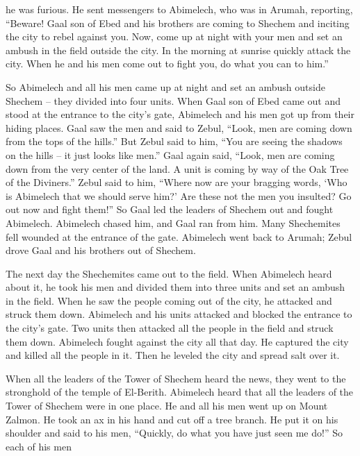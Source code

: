 {he was furious.
He sent
messengers
to
Abimelech,
who was in Arumah,
reporting,
“Beware!
 Gaal
son
of Ebed
and his brothers
are coming
to Shechem
and inciting
the city
to rebel against you.
Now,
come up
at night
with
your
men
and set an ambush
in the field outside the city.
In the morning
at sunrise
quickly
attack
the city.
When he and his men
come out
to
fight you, do
what
you can to him.”
\par }{\PP {}So Abimelech
and all
his men
came up
at night
and set an ambush
outside Shechem
– they divided into four
units.
When Gaal
son
of Ebed
came out
and stood
at the entrance
to the city’s
gate,
Abimelech
and his men
got up
from
their hiding places.
Gaal
saw
the men
and said
to
Zebul,
“Look,
men
are coming down
from the tops
of the hills.”
But Zebul
said
to
him, “You
are seeing
the shadows
on the hills
– it just looks like men.”
Gaal
again
said,
“Look,
men
are coming down
from the very center
of the land.
A unit
is coming
by way
of the Oak
Tree of the Diviners.”
Zebul
said
to him,
“Where
now
are your bragging words, ‘Who
is Abimelech
that
we should serve
him?’ Are these
not
the men
you insulted? Go out
now
and fight them!”
So Gaal
led
the leaders
of
Shechem
out
and fought
Abimelech.
Abimelech
chased
him, and Gaal ran
from
him. Many
Shechemites fell
wounded
at the entrance
of the gate.
Abimelech
went back
to Arumah;
Zebul
drove
Gaal
and his brothers
out
of Shechem.
\par }{\PP {}The next day
the Shechemites
came
out
to the field.
When Abimelech
heard about it,
he took
his men
and divided
them into three
units
and set an ambush
in the field.
When he saw
the people
coming
out
of the city,
he attacked
and struck them down.
Abimelech
and his units
attacked and blocked
the entrance
to the city’s
gate.
Two
units
then attacked
all
the people in
the field
and struck them down.
Abimelech
fought
against the city
all
that day.
He
captured
the city
and killed
all the people
in it. Then he leveled
the city
and spread
salt over it.
\par }{\PP {}When all
the leaders
of the Tower
of Shechem
heard
the news, they went
to
the stronghold
of the temple
of El-Berith.
Abimelech
heard that
all
the leaders
of the Tower
of Shechem
were in one place.
He
and all
his men
went up
on Mount
Zalmon.
He
took
an ax
in
his hand
and cut off
a tree
branch.
He put
it on
his shoulder
and said
to
his men,
“Quickly,
do
what
you have just
seen
me do!”
So each
of his men
}
